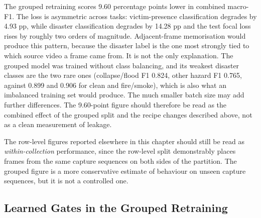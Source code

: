 The grouped retraining scores 9.60 percentage points lower in combined macro-F1. The loss is asymmetric across tasks: victim-presence classification degrades by 4.93 pp, while disaster classification degrades by 14.28 pp and the test focal loss rises by roughly two orders of magnitude. Adjacent-frame memorisation would produce this pattern, because the disaster label is the one most strongly tied to which source video a frame came from. It is not the only explanation. The grouped model was trained without class balancing, and its weakest disaster classes are the two rare ones (collapse/flood F1 0.824, other hazard F1 0.765, against 0.899 and 0.906 for clean and fire/smoke), which is also what an imbalanced training set would produce. The much smaller batch size may add further differences. The 9.60-point figure should therefore be read as the combined effect of the grouped split and the recipe changes described above, not as a clean measurement of leakage.

The row-level figures reported elsewhere in this chapter should still be read as \emph{within-collection} performance, since the row-level split demonstrably places frames from the same capture sequences on both sides of the partition. The grouped figure is a more conservative estimate of behaviour on unseen capture sequences, but it is not a controlled one.

\subsection{Learned Gates in the Grouped Retraining}
\label{sec:grouped_gates}

